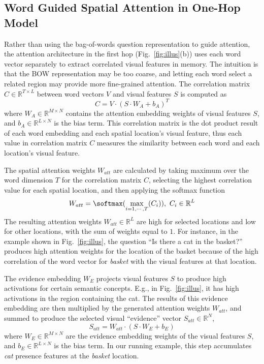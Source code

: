 \subsection{Word Guided Spatial Attention in One-Hop Model}\label{sec:att1}
Rather than using the bag-of-words question representation to guide attention,
the attention architecture in the first hop (Fig.~\ref{fig:illus}(b)) uses each word vector separately to extract correlated visual features in memory. 
The intuition is that the BOW representation may be too coarse, and letting each word select a related region may provide more fine-grained attention. 
The correlation matrix $C \in \mathbb{R}^{T\times L}$ between word vectors $V$ and visual features $S$ is computed as
\begin{equation}
C = V \cdot (S \cdot W_A + b_A)^T
\end{equation}
where $W_A \in \mathbb{R}^{M\times N}$ contains the attention embedding weights of visual features $S$, and $b_A \in \mathbb{R}^{L\times N}$ is the bias term. 
This correlation matrix is the dot product result of each word embedding and each spatial location's visual feature, thus each value in correlation matrix $C$ measures the similarity between each word and each location's visual feature. 

The spatial attention weights $W_{att}$ are calculated by taking maximum over the word dimension $T$ for the correlation matrix $C$, selecting the highest correlation value for each spatial location, and then applying the softmax function
\begin{equation}
W_{att} = \softmax(\max_{i=1,\cdots,T}(C_i)), ~C_i \in \mathbb{R}^L
\end{equation}
The resulting attention weights $W_{att} \in \mathbb{R}^{L}$ are high for selected locations and low for other locations, with the sum of weights equal to $1$. For instance, in the example shown in Fig.~\ref{fig:illus}, the question ``Is there a cat in the basket?'' produces high attention weights for the location of the basket because of the high correlation of the word vector for \textit{basket} with the visual features at that location. 

The evidence embedding $W_E$ projects visual features $S$ to produce high activations for certain semantic concepts. E.g., in Fig.~\ref{fig:illus}, it has high activations in the region containing the cat. The results of this evidence embedding are then multiplied by the generated attention weights $W_{att}$, and summed to produce the selected visual ``evidence'' vector $S_{att} \in \mathbb{R}^N$,
\begin{equation}
S_{att} = W_{att} \cdot (S \cdot W_E + b_E) \label{eqn:evidence}
\end{equation}
where $W_E \in \mathbb{R}^{M\times N}$ are the evidence embedding weights of the visual features $S$, and $b_E \in \mathbb{R}^{L\times N}$ is the bias term.
In our running example, this step accumulates \textit{cat} presence features at the \textit{basket} location. 

